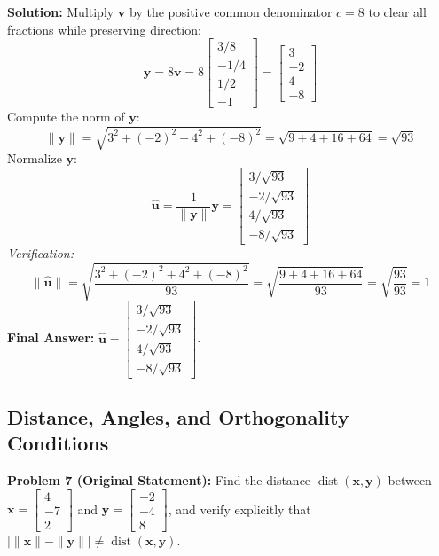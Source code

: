 \documentclass[11pt, letterpaper]{article}
\theoremstyle{definition}
\theoremstyle{remark}
\begin{document}
\textbf{Solution:}
Multiply $\mathbf{v}$ by the positive common denominator $c = 8$ to clear all fractions while preserving direction:
\[
\mathbf{y} = 8\mathbf{v} = 8\begin{bmatrix} 3/8 \\ -1/4 \\ 1/2 \\ -1 \end{bmatrix} = \begin{bmatrix} 3 \\ -2 \\ 4 \\ -8 \end{bmatrix}
\]
Compute the norm of $\mathbf{y}$:
\[
\|\mathbf{y}\| = \sqrt{3^2 + (-2)^2 + 4^2 + (-8)^2} = \sqrt{9 + 4 + 16 + 64} = \sqrt{93}
\]
Normalize $\mathbf{y}$:
\[
\hat{\mathbf{u}} = \frac{1}{\|\mathbf{y}\|}\mathbf{y} = \begin{bmatrix} 3/\sqrt{93} \\ -2/\sqrt{93} \\ 4/\sqrt{93} \\ -8/\sqrt{93} \end{bmatrix}
\]
\textit{Verification:}
\[
\|\hat{\mathbf{u}}\| = \sqrt{\frac{3^2 + (-2)^2 + 4^2 + (-8)^2}{93}} = \sqrt{\frac{9 + 4 + 16 + 64}{93}} = \sqrt{\frac{93}{93}} = 1
\]
\textbf{Final Answer:} $\hat{\mathbf{u}} = \begin{bmatrix} 3/\sqrt{93} \\ -2/\sqrt{93} \\ 4/\sqrt{93} \\ -8/\sqrt{93} \end{bmatrix}$.

\subsection{Distance, Angles, and Orthogonality Conditions}

\textbf{Problem 7 (Original Statement):} Find the distance $\operatorname{dist}(\mathbf{x}, \mathbf{y})$ between $\mathbf{x} = \begin{bmatrix} 4 \\ -7 \\ 2 \end{bmatrix}$ and $\mathbf{y} = \begin{bmatrix} -2 \\ -4 \\ 8 \end{bmatrix}$, and verify explicitly that $|\|\mathbf{x}\| - \|\mathbf{y}\|| \neq \operatorname{dist}(\mathbf{x}, \mathbf{y})$.
\end{document}
